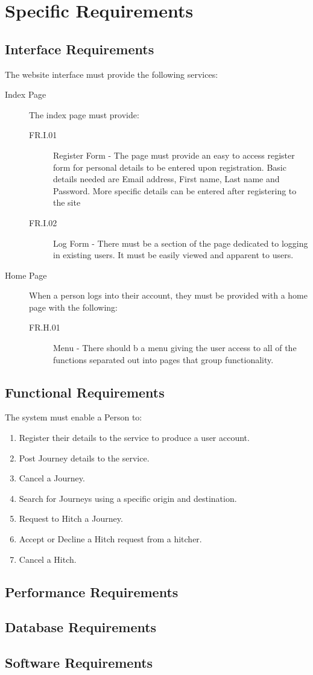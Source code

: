 \documentclass[11pt]{article}
\begin{document}
\section{Specific Requirements}
\subsection{Interface Requirements}
The website interface must provide the following services:
\begin{description}

\item[Index Page] The index page must provide:
\begin{description}
\item[FR.I.01] Register Form - The page must provide an easy to access register form for personal details to be entered upon registration. Basic details needed are Email address, First name, Last name and Password. More specific details can be entered after registering to the site
\item[FR.I.02] Log Form - There must be a section of the page dedicated to logging in existing users. It must be easily viewed and apparent to users.
\end{description}

\item[Home Page] When a person logs into their account, they must be provided with a home page with the following:
\begin{description}
\item[FR.H.01] Menu - There should b a menu giving the user access to all of the functions separated out into pages that group functionality. 
\end{description}
\end{description}

\subsection{Functional Requirements}
The system must enable a Person to:
\begin{enumerate}
\item Register their details to the service to produce a user account.
\item Post Journey details to the service.
\item Cancel a Journey.
\item Search for Journeys using a specific origin and destination.
\item Request to Hitch a Journey.
\item Accept or Decline a Hitch request from a hitcher.
\item Cancel a Hitch.
\end{enumerate}
\subsection{Performance Requirements}
\subsection{Database Requirements}

\subsection{Software Requirements}
\end{document}
